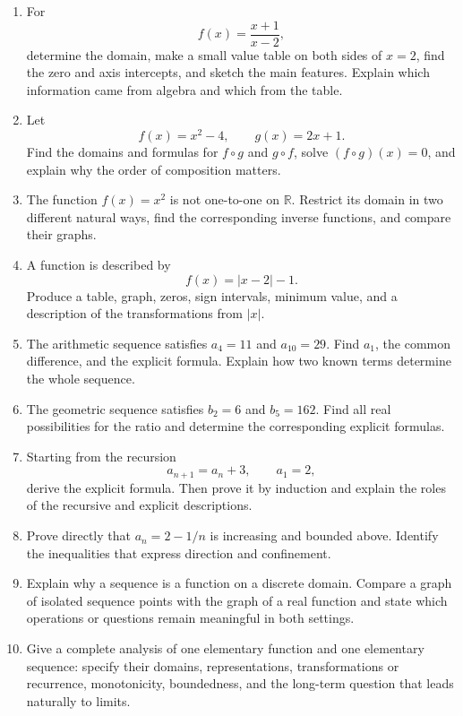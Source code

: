\begin{enumerate}
\item For
\[
f(x)=\frac{x+1}{x-2},
\]
determine the domain, make a small value table on both sides of $x=2$, find the zero and axis intercepts, and sketch the main features. Explain which information came from algebra and which from the table.

\item Let
\[
f(x)=x^2-4,
\qquad
g(x)=2x+1.
\]
Find the domains and formulas for $f\circ g$ and $g\circ f$, solve $(f\circ g)(x)=0$, and explain why the order of composition matters.

\item The function $f(x)=x^2$ is not one-to-one on $\mathbb R$. Restrict its domain in two different natural ways, find the corresponding inverse functions, and compare their graphs.

\item A function is described by
\[
f(x)=|x-2|-1.
\]
Produce a table, graph, zeros, sign intervals, minimum value, and a description of the transformations from $|x|$.

\item The arithmetic sequence satisfies $a_4=11$ and $a_{10}=29$. Find $a_1$, the common difference, and the explicit formula. Explain how two known terms determine the whole sequence.

\item The geometric sequence satisfies $b_2=6$ and $b_5=162$. Find all real possibilities for the ratio and determine the corresponding explicit formulas.

\item Starting from the recursion
\[
a_{n+1}=a_n+3,
\qquad a_1=2,
\]
derive the explicit formula. Then prove it by induction and explain the roles of the recursive and explicit descriptions.

\item Prove directly that $a_n=2-1/n$ is increasing and bounded above. Identify the inequalities that express direction and confinement.

\item Explain why a sequence is a function on a discrete domain. Compare a graph of isolated sequence points with the graph of a real function and state which operations or questions remain meaningful in both settings.

\item Give a complete analysis of one elementary function and one elementary sequence: specify their domains, representations, transformations or recurrence, monotonicity, boundedness, and the long-term question that leads naturally to limits.
\end{enumerate}
